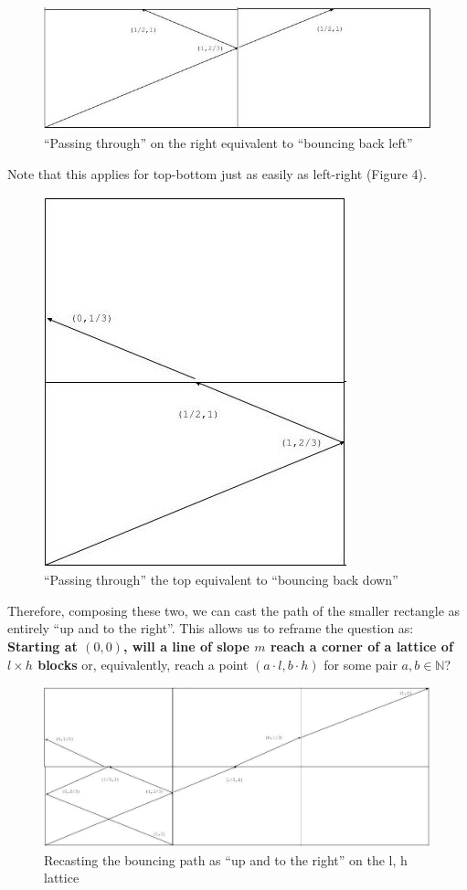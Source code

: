 \documentclass[11pt, oneside]{article} 	%
\begin{document}
\begin{figure}[!htb]
\centering
\includegraphics[scale=.5]{mirrorright}
 \caption{``Passing through'' on the right equivalent to ``bouncing back left''}
\end{figure}

Note that this applies for top-bottom just as easily as left-right (Figure 4). 

\begin{figure}[!htb]
\centering
\includegraphics[scale=.5]{mirrorup}
 \caption{``Passing through'' the top equivalent to ``bouncing back down''}
\end{figure}

Therefore, composing these two, we can cast the path of the smaller rectangle as entirely ``up and to the right''. This allows us to reframe the question as: \textbf{Starting at $(0,0)$, will a line of slope $m$ reach a corner of a lattice of $l \times h$ blocks} or, equivalently, reach a point $(a \cdot l, b \cdot h)$ for some pair $a,b \in \mathbb{N}$?

\begin{figure}[!htb]
\centering
\includegraphics[scale=.4]{fullpath}
 \caption{Recasting the bouncing path as ``up and to the right'' on the l, h lattice}
\end{figure}
\end{document}

